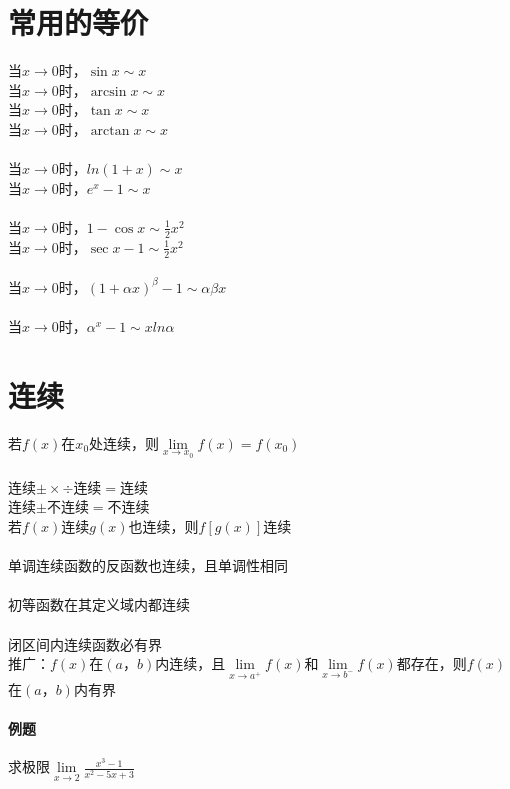\documentclass{article}
\begin{document}
\begin{flushleft}
	\section{常用的等价}
	
	当$x\to 0$时，$\sin x \sim x$\\
	当$x\to 0$时，$\arcsin x \sim x$\\
	当$x\to 0$时，$\tan x \sim x$\\
	当$x\to 0$时，$\arctan x \sim x$\\
	~\\
	当$x\to 0$时，$ln(1+x) \sim x$\\
	当$x\to 0$时，$e^x-1 \sim x$\\
	~\\
	当$x\to 0$时，$1-\cos x \sim \frac{1}{2} x^2$\\
	当$x\to 0$时，$\sec x - 1 \sim \frac{1}{2} x^2$\\
	~\\
	当$x\to 0$时，$(1+\alpha x)^\beta -1 \sim \alpha\beta x$\\
	~\\
	当$x\to 0$时，$\alpha^x -1 \sim xln\alpha$\\
	
	\section{连续}
	
	若$f(x)$在$x_0$处连续，则$\lim\limits_{x\to x_0} f(x)=f(x_0)$\\
	~\\
	连续$\pm\times\div$连续$=$连续\\
	连续$\pm$不连续$=$不连续\\
	若$f(x)$连续$g(x)$也连续，则$f[g(x)]$连续\\
	~\\
	单调连续函数的反函数也连续，且单调性相同\\
	~\\
	初等函数在其定义域内都连续\\
	~\\
	闭区间内连续函数必有界\\
	推广：$f(x)$在$(a，b)$内连续，且$\lim\limits_{x\to a^+} f(x)$和$\lim\limits_{x\to b^-} f(x)$都存在，则$f(x)$在$(a，b)$内有界\\
	
	\paragraph{例题}
	求极限$\lim\limits_{x\to 2}\frac{x^3-1}{x^2-5x+3}$

\end{flushleft}
\end{document}
